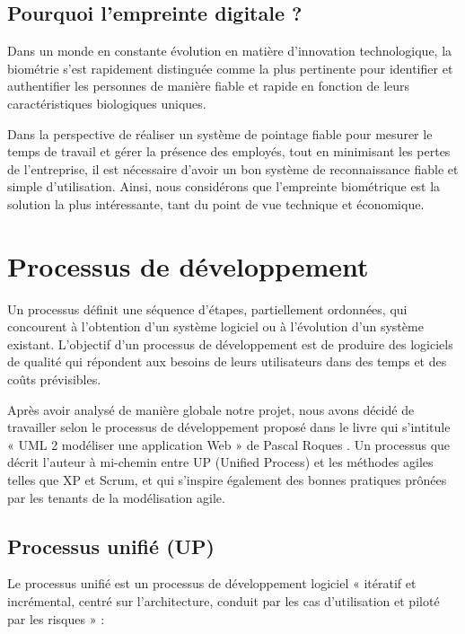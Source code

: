 \subsection{Pourquoi l’empreinte digitale ?}
Dans un monde en constante évolution en matière d’innovation technologique, la
biométrie s’est rapidement distinguée comme la plus pertinente pour identifier
et authentifier les personnes de manière fiable et rapide en fonction de leurs
caractéristiques biologiques uniques.

Dans la perspective de réaliser un système de pointage fiable pour mesurer le
temps de travail et gérer la présence des employés, tout en minimisant les pertes de
l’entreprise, il est nécessaire d’avoir un bon système de reconnaissance fiable
et simple d’utilisation. Ainsi, nous considérons que l’empreinte biométrique est
la solution la plus intéressante, tant du point de vue technique et économique. 

\section{Processus de développement}
Un processus définit une séquence d’étapes, partiellement ordonnées, qui
concourent à l’obtention d’un système logiciel ou à l’évolution d’un système
existant. L’objectif d’un processus de développement est de produire des logiciels
de qualité qui répondent aux besoins de leurs utilisateurs dans des temps et des
coûts prévisibles. 

Après avoir analysé de manière globale notre projet, nous avons décidé de
travailler selon le processus de développement proposé dans le livre qui
s’intitule « UML 2 modéliser une application Web » de Pascal Roques \cite{5}. Un
processus que décrit l’auteur à mi-chemin entre UP (Unified Process) et les
méthodes agiles telles que XP et Scrum, et qui s’inspire également des bonnes
pratiques prônées par les tenants de la modélisation agile.

\subsection{Processus unifié (UP)}
Le processus unifié est un processus de développement logiciel « itératif et
incrémental, centré sur l’architecture, conduit par les cas d’utilisation et
piloté par les risques » \cite{5}:
    
